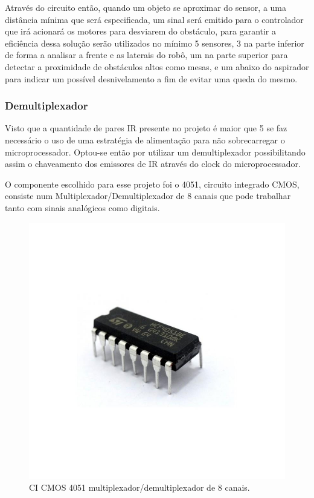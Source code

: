     Através do circuito então, quando um objeto se aproximar do sensor, a uma distância mínima que será especificada, um sinal será emitido para o controlador que irá acionará os motores para desviarem do obstáculo, para garantir a eficiência dessa solução serão utilizados no mínimo 5 sensores, 3 na parte inferior de forma a analisar a frente e as laterais do robô, um na parte superior para detectar a proximidade de obstáculos altos como mesas, e um abaixo do aspirador para indicar um possível desnivelamento a fim de evitar uma queda do mesmo.
                               
  \subsubsection{Demultiplexador}                        
  \label{sub:demultiplexador}
    Visto que a quantidade de pares IR presente no projeto é maior que 5 se faz necessário o uso de uma estratégia de alimentação para não sobrecarregar o microprocessador. Optou-se então por utilizar um demultiplexador possibilitando assim o chaveamento dos emissores de IR através do clock do microprocessador.

    O componente escolhido para esse projeto foi o 4051, circuito integrado CMOS, consiste num Multiplexador/Demultiplexador de 8 canais que pode trabalhar tanto com sinais analógicos como digitais.\cite{newtoncbraga}

  \begin{figure}[H]                                                           
    \centering                                                                
    \includegraphics[scale=0.2]{figuras/multiplexador.png}             
    \caption{ CI CMOS 4051 multiplexador/demultiplexador de 8 canais.} 
    \label{img:multiplexador}                                            
  \end{figure}                                                                

